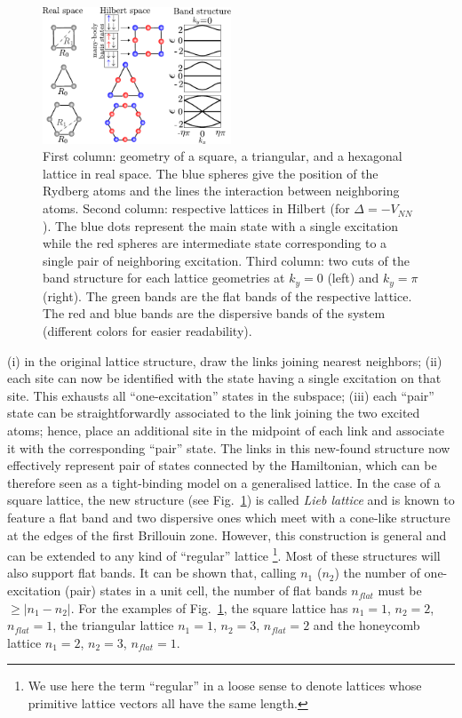 \documentclass[prl,aps,twocolumn,showpacs,superscriptaddress,longbibliography]{revtex4-1}
\newcommand{\abs}[1]{\left| #1 \right|}
\begin{document}
\begin{figure}
% 	    

	      \includegraphics[width=0.5\textwidth]{graphics/lattices_real_hilbert_bands.pdf}

		\caption{
		    First column: geometry of a square, a triangular, and a hexagonal lattice 
		    in real space. The blue spheres give the position of the Rydberg atoms and
		    the lines the interaction between neighboring atoms. Second column: respective lattices in Hilbert 
		    (for $\Delta = -V_{NN}$). The blue dots represent the main state with a single excitation while the red spheres
		    are intermediate state corresponding to a single pair of neighboring excitation.
		    Third column: two cuts of the band structure for each lattice geometries at $k_y= 0$ (left) and $k_y = \pi$ (right).
		    The green bands are the flat bands of the respective lattice. The red and blue bands are the dispersive bands of the system
		    (different colors for easier readability).
                    }
  
	\label{Fig:flat_band_lattices}
\end{figure} 
(i) in the original lattice structure, draw the links joining nearest neighbors; (ii) each site can now be identified with the state having a single excitation on that site. This exhausts all ``one-excitation'' states in the subspace; (iii) each ``pair'' state can be straightforwardly associated to the link joining the two excited atoms; hence, place an additional site in the midpoint of each link and associate it with the corresponding ``pair'' state. The links in this new-found structure now effectively represent pair of states connected by the Hamiltonian, which can be therefore seen as a tight-binding model on a generalised lattice. In the case of a square lattice, the new structure (see Fig.~\ref{Fig:flat_band_lattices}) is called \emph{Lieb lattice} and is known to feature a flat band and two dispersive ones which meet with a cone-like structure at the edges of the first Brillouin zone. However, this construction is general and can be extended to any kind of ``regular'' lattice \footnote{We use here the term ``regular'' in a loose sense to denote lattices whose primitive lattice vectors all have the same length.}. Most of these structures will also support flat bands. It can be shown \cite{SM} that, calling $n_1$ ($n_2$) the number of one-excitation (pair) states in a unit cell, the number of flat bands $n_{flat}$ must be $\geq \abs{n_1 - n_2}$. For the examples of Fig.~\ref{Fig:flat_band_lattices}, the square lattice has $n_1 = 1$, $n_2 = 2$, $n_{flat} = 1$, the triangular lattice $n_1 = 1$, $n_2 = 3$, $n_{flat} = 2$ and the honeycomb lattice $n_1 = 2$, $n_2 = 3$, $n_{flat} = 1$. 
\end{document}
